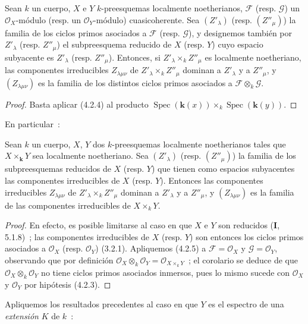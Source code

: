 \begin{proposition}[4.2.5]
\label{IV.2.4.2.5-fr}
Sean $k$ un cuerpo, $X$ e $Y$ $k$-preesquemas localmente noetherianos,
$\mathcal F$ \textup{(resp. $\mathcal G$)} un $\mathcal O_X$-módulo \textup{(resp.} un
$\mathcal O_Y$-módulo\textup{)} cuasicoherente. Sea $(Z'_\lambda)$ \textup{(resp.
$(Z''_\mu)$)} la familia de los ciclos primos asociados a $\mathcal F$ \textup{(resp.
$\mathcal G$)}, y designemos también por $Z'_\lambda$ \textup{(resp. $Z''_\mu$)} el
subpreesquema reducido de $X$ \textup{(resp. $Y$)} cuyo espacio subyacente es
$Z'_\lambda$ \textup{(resp. $Z''_\mu$)}. Entonces, si $Z'_\lambda\times_k Z''_\mu$
es localmente noetheriano, las componentes irreducibles $Z_{\lambda\mu\nu}$
de $Z'_\lambda\times_k Z''_\mu$ dominan a $Z'_\lambda$ y a $Z''_\mu$, y
$(Z_{\lambda\mu\nu})$ es la familia de los distintos ciclos primos asociados a
$\mathcal F\otimes_k\mathcal G$.
\end{proposition}

\begin{proof}
Basta aplicar (4.2.4) al producto
$\operatorname{Spec}(\boldsymbol{k}(x))\times_k\operatorname{Spec}(\boldsymbol{k}(y))$.
\end{proof}

En particular~:

\begin{corollary}[4.2.6]
\label{IV.2.4.2.6-fr}
Sean $k$ un cuerpo, $X$, $Y$ dos $k$-preesquemas localmente noetherianos tales
que $X\times_{\boldsymbol{k}} Y$ sea localmente noetheriano. Sea $(Z'_\lambda)$ \textup{(resp.
$(Z''_\mu)$)} la familia de los subpreesquemas reducidos de $X$ \textup{(resp. $Y$)} que
tienen como espacios subyacentes las componentes irreducibles de $X$ \textup{(resp.
$Y$)}. Entonces las componentes irreducibles $Z_{\lambda\mu\nu}$ de
$Z'_\lambda\times_k Z''_\mu$ dominan a $Z'_\lambda$ y a $Z''_\mu$, y
$(Z_{\lambda\mu\nu})$ es la familia de las componentes irreducibles de
$X\times_k Y$.
\end{corollary}

\begin{proof}
En efecto, es posible limitarse al caso en que $X$ e $Y$ son reducidos
(\textbf I, 5.1.8)~; las componentes irreducibles de $X$ (resp. $Y$) son entonces los
ciclos primos asociados a $\mathcal O_X$ (resp. $\mathcal O_Y$) (3.2.1). Apliquemos (4.2.5)
a $\mathcal F=\mathcal O_X$ y $\mathcal G=\mathcal O_Y$, observando que por
definición $\mathcal O_X\otimes_k\mathcal O_Y=\mathcal O_{X\times_k Y}$~; el
corolario se deduce de que $\mathcal O_X\otimes_k\mathcal O_Y$ no tiene ciclos
primos asociados inmersos, pues lo mismo sucede con $\mathcal O_X$ y
$\mathcal O_Y$ por hipótesis (4.2.3).
\end{proof}

Apliquemos los resultados precedentes al caso en que $Y$ es el espectro de una
\emph{extensión} $K$ de $k$~:
